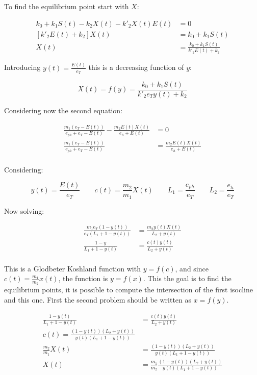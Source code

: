    To find the equilibrium point start with $X$:

    \begin{align*}
      k_0 + k_1S(t) - k_2X(t) - k'_2X(t)E(t) &= 0\\
      [k'_2E(t) + k_2]X(t) &= k_0 + k_1S(t)\\
      X(t) &= \frac{k_0 + k_1S(t)}{k'_2E(t) + k_2}
    \end{align*}

    Introducing $y(t) = \frac{E(t)}{e_T}$ this is a decreasing function of $y$:

    $$X(t) = f(y) = \frac{k_0 + k_1S(t)}{k'_2e_Ty(t) + k_2}$$

    Considering now the second equation:

    \begin{align*}
      \frac{m_1(e_T-E(t))}{e_{ph} + e_T-E(t)} - \frac{m_2E(t)X(t)}{e_h + E(t)} &= 0\\
      \frac{m_1(e_T-E(t))}{e_{ph} + e_T-E(t)} &= \frac{m_2E(t)X(t)}{e_h + E(t)}\\
    \end{align*}

    Considering:

    $$y(t) = \frac{E(t)}{e_T}\qquad c(t) = \frac{m_2}{m_1}X(t)\qquad L_1 = \frac{e_{ph}}{e_T}\qquad L_2=\frac{e_h}{e_T}$$

    Now solving:

    \begin{align*}
      \frac{m_1e_T(1-y(t))}{e_T(L_1 + 1-y(t))} &= \frac{m_2y(t)X(t)}{L_2 + y(t)}\\
      \frac{1-y}{L_1 + 1-y(t)} &= \frac{c(t)y(t)}{L_2 + y(t)}\\
    \end{align*}

    This is a Glodbeter Koshland function with $y = f(c)$, and since $c(t) = \frac{m_1}{m_2}x(t)$, the function is $y = f(x)$.
    This the goal is to find the equilibrium points, it is possible to compute the intersection of the first isocline and this one.
    First the second problem should be written as $x = f(y)$.

    \begin{align*}
      \frac{1-y(t)}{L_1 + 1-y(t)} &= \frac{c(t)y(t)}{L_2 + y(t)}\\
      c(t) = \frac{(1-y(t))(L_2 + y(t))}{y(t)(L_1 + 1-y(t))}\\
      \frac{m_2}{m_1}X(t) &= \frac{(1-y(t))(L_2 + y(t))}{y(t)(L_1 + 1-y(t))}\\
      X(t) &= \frac{m_1}{m_2}\frac{(1-y(t))(L_2 + y(t))}{y(t)(L_1 + 1-y(t))}\\
    \end{align*}


